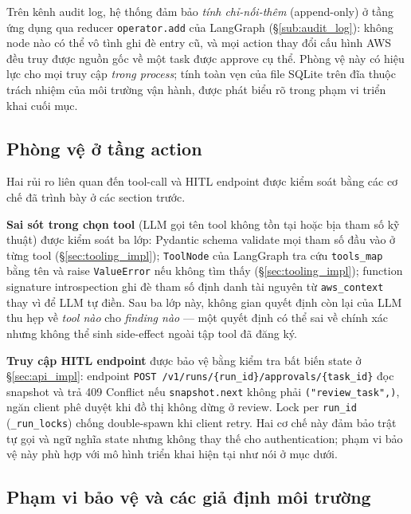 Trên kênh audit log, hệ thống đảm bảo \emph{tính chỉ-nối-thêm} (append-only) ở tầng ứng dụng qua reducer \texttt{operator.add} của LangGraph (\S\ref{sub:audit_log}): không node nào có thể vô tình ghi đè entry cũ, và mọi action thay đổi cấu hình AWS đều truy được nguồn gốc về một task được approve cụ thể. Phòng vệ này có hiệu lực cho mọi truy cập \emph{trong process}; tính toàn vẹn của file SQLite trên đĩa thuộc trách nhiệm của môi trường vận hành, được phát biểu rõ trong phạm vi triển khai cuối mục.

\subsection{Phòng vệ ở tầng action}
\label{sub:agent_action_defense}

Hai rủi ro liên quan đến tool-call và HITL endpoint được kiểm soát bằng các cơ chế đã trình bày ở các section trước.

\textbf{Sai sót trong chọn tool} (LLM gọi tên tool không tồn tại hoặc bịa tham số kỹ thuật) được kiểm soát ba lớp: Pydantic schema validate mọi tham số đầu vào ở từng tool (\S\ref{sec:tooling_impl}); \texttt{ToolNode} của LangGraph tra cứu \texttt{tools\_map} bằng tên và raise \texttt{ValueError} nếu không tìm thấy (\S\ref{sec:tooling_impl}); function signature introspection ghi đè tham số định danh tài nguyên từ \texttt{aws\_context} thay vì để LLM tự điền. Sau ba lớp này, không gian quyết định còn lại của LLM thu hẹp về \emph{tool nào} cho \emph{finding nào} --- một quyết định có thể sai về chính xác nhưng không thể sinh side-effect ngoài tập tool đã đăng ký.

\textbf{Truy cập HITL endpoint} được bảo vệ bằng kiểm tra bất biến state ở \S\ref{sec:api_impl}: endpoint \texttt{POST /v1/runs/\{run\_id\}/approvals/\{task\_id\}} đọc snapshot và trả 409 Conflict nếu \texttt{snapshot.next} không phải \texttt{("review\_task",)}, ngăn client phê duyệt khi đồ thị không dừng ở review. Lock per \texttt{run\_id} (\texttt{\_run\_locks}) chống double-spawn khi client retry. Hai cơ chế này đảm bảo trật tự gọi và ngữ nghĩa state nhưng không thay thế cho authentication; phạm vi bảo vệ này phù hợp với mô hình triển khai hiện tại như nói ở mục dưới.

\subsection{Phạm vi bảo vệ và các giả định môi trường}
\label{sub:agent_scope_assumptions}

